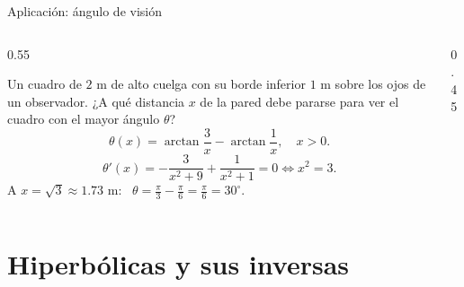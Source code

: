 \documentclass[10pt,aspectratio=169]{beamer}
\begin{document}
\begin{frame}{Aplicación: ángulo de visión}
  \begin{columns}
    \begin{column}{0.55\textwidth}
      \begin{ejemplo}[7]
        Un cuadro de $2$ m de alto cuelga con su borde inferior $1$ m sobre los ojos de un observador. ¿A qué distancia $x$ de la pared debe
        pararse para ver el cuadro con el mayor ángulo $\theta$?
        \[ \theta(x)=\arctan\frac3x-\arctan\frac1x,\quad x>0. \]
        \[ \theta'(x)=-\frac{3}{x^2+9}+\frac{1}{x^2+1}=0\iff x^2=3. \]
        A $x=\sqrt3\approx1.73$ m: \ $\theta=\frac\pi3-\frac\pi6=\frac\pi6=30^\circ$.
      \end{ejemplo}
    \end{column}
    \begin{column}{0.45\textwidth}
      \centering
    \end{column}
  \end{columns}
\end{frame}

\section{Hiperbólicas y sus inversas}
\end{document}
